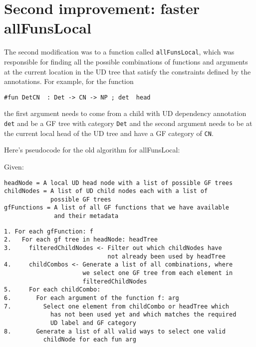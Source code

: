 

\section{Second improvement: faster allFunsLocal}

The second modification was to a function called \texttt{allFunsLocal}, which was responsible for finding all the possible combinations of functions and arguments at the current location in the UD tree that satisfy the constraints defined by the annotations. For example, for the function

\begin{verbatim}
#fun DetCN  : Det -> CN -> NP ; det  head
\end{verbatim}

the first argument needs to come from a child with UD dependency annotation \texttt{det} and be a GF tree with category \texttt{Det} and the second argument needs to be at the current local head of the UD tree and have a GF category of \texttt{CN}.

Here's pseudocode for the old algorithm for allFunsLocal:

Given:
\begin{verbatim}
headNode = A local UD head node with a list of possible GF trees
childNodes = A list of UD child nodes each with a list of
             possible GF trees
gfFunctions = A list of all GF functions that we have available
              and their metadata
\end{verbatim}



\begin{verbatim}
1. For each gfFunction: f
2.   For each gf tree in headNode: headTree
3.     filteredChildNodes <- Filter out which childNodes have
                             not already been used by headTree
4.     childCombos <- Generate a list of all combinations, where
                      we select one GF tree from each element in
                      filteredChildNodes
5.     For each childCombo:
6.       For each argument of the function f: arg
7.         Select one element from childCombo or headTree which
             has not been used yet and which matches the required
             UD label and GF category
8.       Generate a list of all valid ways to select one valid
           childNode for each fun arg
\end{verbatim}

